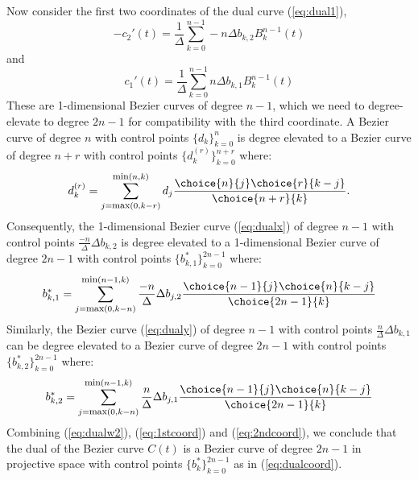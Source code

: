 \documentclass[11pt]{article}
\begin{document}
Now consider the first two coordinates of the dual curve (\ref{eq:dual1}), 
\begin{equation}
\label{eq:dualx}
-c_2'(t) = \frac{1}{\Delta} \sum_{k=0}^{n-1} -n \Delta b_{k,2} B_k^{n-1}(t)
\end{equation}
and
\begin{equation}
\label{eq:dualy}
c_1'(t)  = \frac{1}{\Delta} \sum_{k=0}^{n-1}  n \Delta b_{k,1} B_k^{n-1}(t)
\end{equation}
These are 1-dimensional Bezier curves of degree $n-1$,
which we need to degree-elevate to degree $2n-1$
for compatibility with the third coordinate.
%
A Bezier curve of degree $n$ with control points $\{ d_k \}_{k=0}^n$ 
is degree elevated \cite{farin97} to a Bezier curve of degree $n+r$ with control points
$\{ d_k^{(r)} \}_{k=0}^{n+r}$ where:
\[
d_k^{(r)} = \sum_{j=\mbox{\footnotesize{max}}(0,k-r)}^{\mbox{\footnotesize{min}}(n,k)} 
		d_j \frac{\choice{n}{j} \choice{r}{k-j} }{ \choice{n+r}{k} }.
\]
Consequently, the 1-dimensional Bezier curve (\ref{eq:dualx}) 
of degree $n-1$ with control points $\frac{-n}{\Delta} \Delta b_{k,2}$
is degree elevated to a 1-dimensional Bezier curve of degree $2n-1$
with control points $\{b^*_{k,1} \}_{k=0}^{2n-1}$ where:
\begin{equation}
\label{eq:1stcoord}
b^*_{k,1} = 
\sum_{j=\mbox{\footnotesize{max}}(0,k-n)}^{\mbox{\footnotesize{min}}(n-1,k)} 
	\frac{-n}{\Delta} \Delta b_{j,2}
	\frac{ \choice{n-1}{j} \choice{n}{k-j} }{ \choice{2n-1}{k} }
\end{equation}
%
%
Similarly, the Bezier curve (\ref{eq:dualy})
of degree $n-1$ with control points $\frac{n}{\Delta} \Delta b_{k,1}$ 
can be degree elevated to a Bezier curve of degree $2n-1$ with control points 
$\{b^*_{k,2} \}_{k=0}^{2n-1}$ where:
\begin{equation}
\label{eq:2ndcoord}
b^*_{k,2} = 
\sum_{j=\mbox{\footnotesize{max}}(0,k-n)}^{\mbox{\footnotesize{min}}(n-1,k)} 
	\frac{n}{\Delta} \Delta b_{j,1}
	\frac{ \choice{n-1}{j} \choice{n}{k-j} }{ \choice{2n-1}{k} }
\end{equation}
%
Combining (\ref{eq:dualw2}), (\ref{eq:1stcoord}) and (\ref{eq:2ndcoord}),
we conclude that the dual of the Bezier curve $C(t)$
is a Bezier curve of degree $2n-1$ in projective space with control points 
$\{b^*_k\}_{k=0}^{2n-1}$ as in (\ref{eq:dualcoord}).
\QED
\end{document}
